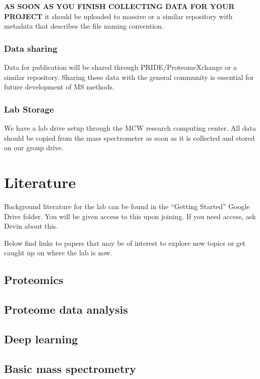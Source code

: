 \documentclass[
]{book}
\begin{document}
\textbf{AS SOON AS YOU FINISH COLLECTING DATA FOR YOUR PROJECT} it should be uploaded to massive or a similar repository with metadata that describes the file naming convention.

\hypertarget{data-sharing}{%
\subsection{Data sharing}\label{data-sharing}}

Data for publication will be shared through PRIDE/ProteomeXchange or a similar repository. Sharing these data with the general community is essential for future development of MS methods.

\hypertarget{lab-storage}{%
\subsection{Lab Storage}\label{lab-storage}}

We have a lab drive setup through the MCW research computing center. All data should be copied from the mass spectrometer as soon as it is collected and stored on our group drive.

\hypertarget{literature}{%
\chapter{Literature}\label{literature}}

Background literature for the lab can be found in the ``Getting Started'' Google Drive folder. You will be given access to this upon joining. If you need access, ask Devin about this.

Below find links to papers that may be of interest to explore new topics or get caught up on where the lab is now.

\hypertarget{proteomics}{%
\section{Proteomics}\label{proteomics}}

\hypertarget{proteome-data-analysis}{%
\section{Proteome data analysis}\label{proteome-data-analysis}}

\hypertarget{deep-learning}{%
\section{Deep learning}\label{deep-learning}}

\hypertarget{basic-mass-spectrometry}{%
\section{Basic mass spectrometry}\label{basic-mass-spectrometry}}

  
\end{document}
